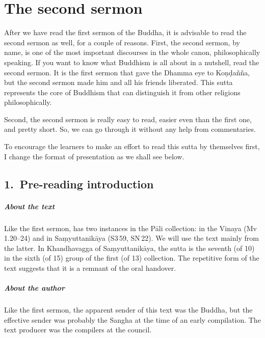\chapter{The second sermon}\label{chap:anattalak}

After we have read the first sermon of the Buddha, it is advisable to read the second sermon as well, for a couple of reasons. First, the second sermon,  by name, is one of the most important discourses in the whole canon, philosophically speaking. If you want to know what Buddhism is all about in a nutshell, read the second sermon. It is the first sermon that gave the Dhamma eye to Ko\d n\d da\~n\~na, but the second sermon made him and all his friends liberated. This sutta represents the core of Buddhism that can distinguish it from other religions philosophically.

Second, the second sermon is really easy to read, easier even than the first one, and pretty short. So, we can go through it without any help from commentaries.

To encourage the learners to make an effort to read this sutta by themselves first, I change the format of presentation as we shall see below.

{}
\section*{1.\ Pre-reading introduction}

\paragraph*{About the text} Like the first sermon,  has two instances in the P\=ali collection: in the Vinaya (Mv\,1.20--24) and in Sa\d myuttanik\=aya (S3\,59, SN\,22). We will use the text mainly from the latter. In Khandhavagga of Sa\d myuttanik\=aya, the sutta is the seventh (of 10) in the sixth (of 15) group of the first (of 13) collection. The repetitive form of the text suggests that it is a remnant of the oral handover.

\paragraph*{About the author} Like the first sermon, the apparent sender of this text was the Buddha, but the effective sender was probably the Sangha at the time of an early compilation. The text producer was the compilers at the council.

